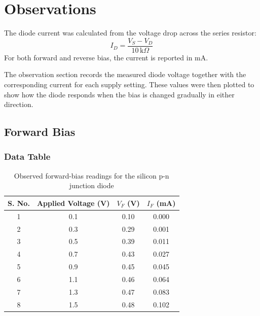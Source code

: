 \section{Observations}

The diode current was calculated from the voltage drop across the series resistor:
\[
  I_D = \frac{V_S - V_D}{10\,\text{k}\Omega}
\]
For both forward and reverse bias, the current is reported in mA.

The observation section records the measured diode voltage together with the corresponding
current for each supply setting. These values were then plotted to show how the diode
responds when the bias is changed gradually in either direction.

\subsection{Forward Bias}
\subsubsection*{Data Table}

\begin{table}[H]
  \centering
  \small
  \caption{Observed forward-bias readings for the silicon p-n junction diode}
  \label{tab:lab2_forward_observation}
  \renewcommand{\arraystretch}{1.15}
  \setlength{\tabcolsep}{6pt}
  \begin{tabular}{|c|c|c|c|}
    \hline
    \textbf{S. No.} & \textbf{Applied Voltage (V)} & \textbf{$V_F$ (V)} & \textbf{$I_F$ (mA)} \\
    \hline
    1               & 0.1                          & 0.10               & 0.000               \\
    \hline
    2               & 0.3                          & 0.29               & 0.001               \\
    \hline
    3               & 0.5                          & 0.39               & 0.011               \\
    \hline
    4               & 0.7                          & 0.43               & 0.027               \\
    \hline
    5               & 0.9                          & 0.45               & 0.045               \\
    \hline
    6               & 1.1                          & 0.46               & 0.064               \\
    \hline
    7               & 1.3                          & 0.47               & 0.083               \\
    \hline
    8               & 1.5                          & 0.48               & 0.102               \\
    \hline
  \end{tabular}
\end{table}


